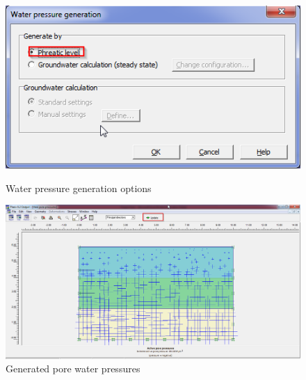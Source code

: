 \begin{landscape}
\begin{figure}[hbtp]
  \centering
  \includegraphics[height=0.25\textheight]{images/plx/a (9).png}
  \caption{Water pressure generation options}
  \vfill
  \includegraphics[height=0.65\textheight]{images/plx/a (10).png}
  \caption{Generated pore water pressures}
\end{figure}
\end{landscape}
\break
